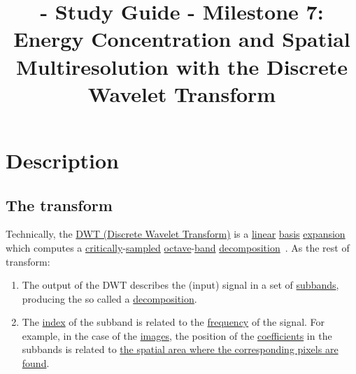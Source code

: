 
\title{\SM{} - Study Guide - Milestone 7: Energy Concentration and Spatial Multiresolution with the Discrete Wavelet Transform}

\maketitle

\tableofcontents

\section{Description}

\subsection{The transform}

Technically, the
\href{https://en.wikipedia.org/wiki/Discrete_wavelet_transform}{DWT
  (Discrete Wavelet Transform)} is a
\href{https://en.wikipedia.org/wiki/Linearity}{linear}
\href{https://en.wikipedia.org/wiki/Change_of_basis}{basis}
\href{https://www.youtube.com/watch?v=P2LTAUO1TdA}{expansion} which
computes a
\href{https://www.dsprelated.com/freebooks/sasp/Critically_Sampled_Perfect_Reconstruction.html}{critically}-\href{https://en.wikipedia.org/wiki/Nyquist-Shannon_sampling_theorem}{sampled}
\href{https://en.wikipedia.org/wiki/Octave_(electronics)}{octave}-\href{https://en.wikipedia.org/wiki/Frequency_band}{band}
\href{https://www.sciencedirect.com/topics/engineering/wavelet-decomposition}{decomposition}~\cite{vetterli2014foundations,kovacevic2013fourier}. As the rest of transform:
\begin{enumerate}
\item The output of the DWT describes the (input) signal in a set of
  \href{https://en.wikipedia.org/wiki/Sub-band_coding}{subbands},
  producing the so called a
  \href{https://en.wikipedia.org/wiki/Discrete_wavelet_transform}{decomposition}.
\item The
  \href{https://en.wikipedia.org/wiki/Array_data_structure#Element_identifier_and_addressing_formulas}{index}
  of the subband is related to the
  \href{https://en.wikipedia.org/wiki/Frequency}{frequency} of the
  signal. For example, in the case of the
  \href{https://en.wikipedia.org/wiki/Digital_image}{images}, the
  position of the
  \href{https://en.wikipedia.org/wiki/Coefficient}{coefficients} in
  the subbands is related to
  \href{https://en.wikipedia.org/wiki/Discrete_wavelet_transform#/media/File:Jpeg2000_2-level_wavelet_transform-lichtenstein.png}{the
    spatial area where the corresponding pixels are found}.
\end{enumerate}

